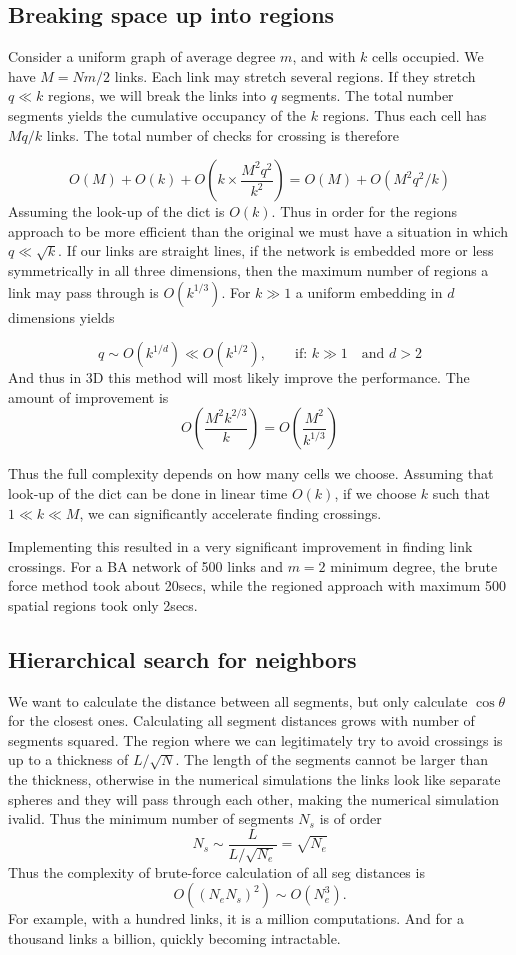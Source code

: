 \documentclass[nofootinbib,preprint,floatfix,titlepage,superscriptaddress]{revtex4} %
\begin{document}
\subsection{Breaking space up into regions}
Consider a uniform graph of average degree $m$, and with $k$ cells occupied. We have $M = Nm/2$ links. Each link may stretch several regions. If they stretch $q \ll k $ regions, we will break the links into $q$ segments. The total number segments yields the cumulative occupancy of the $k$ regions. Thus each cell has $Mq/k$ links. The total number of checks for crossing is therefore


$$ O(M) + O(k)+ O\left( k \times \frac{M^2 q^2 }{ k^2} \right)= O(M)+ O(M^2 q^2/k) $$
Assuming the look-up of the dict is $O(k)$. Thus in order for the regions approach to be more efficient than the original we must have a situation in which $q \ll \sqrt{k}$. If our links are straight lines, if the network is embedded more or less symmetrically in all three dimensions, then the maximum number of regions a link may pass through is $O(k^{1/3})$. For $k \gg 1$ a uniform embedding in $d$ dimensions yields 

$$ q \sim O(k^{1/d}) \ll O(k^{1/2}), \qquad \mbox{if: } k\gg1 \quad \mbox{and } d> 2$$ 
And thus in 3D this method will most likely improve the performance. The amount of improvement is
$$ O\left( \frac{M^2 k^{2/3} }{ k} \right) = O\left(\frac{M^2}{ k^{1/3}} \right) $$

Thus the full complexity depends on how many cells we choose. Assuming that look-up of the dict can be done in linear time $O(k)$, if we choose $ k$ such that $1\ll k \ll M$, we can significantly accelerate finding crossings.  

Implementing this resulted in a very significant improvement in finding link crossings. For a BA network of 500 links and $m=2$ minimum degree, the brute force method took about 20secs, while the regioned approach with maximum 500 spatial regions took only 2secs. 

\subsection{ Hierarchical search for neighbors}
We want to calculate the distance between all segments, but only calculate $\cos\theta$ for the closest ones. Calculating all segment distances grows with number of segments squared. The region where we can legitimately try to avoid crossings is up to a thickness of $L/\sqrt{N}$. The length of the segments cannot be larger than the thickness, otherwise in the numerical simulations the links look like separate spheres and they will pass through each other, making the numerical simulation ivalid. Thus the minimum number of segments $N_s$ is of order
$$ N_s\sim \frac{L}{L/\sqrt{N_e}} = \sqrt{N_e} $$
Thus the complexity of brute-force calculation of all seg distances is 
$$ O((N_e N_s)^2) \sim O(N_e^3). $$  
For example, with a hundred links, it is a million computations. And for a thousand links a billion, quickly becoming intractable. 

\newpage
\end{document}
